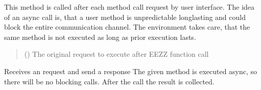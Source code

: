 \documentclass[letterpaper,10pt,english]{sphinxmanual}
\begin{document}
\begin{savenotes}
\begin{fulllineitems}
\begin{savenotes}\begin{fulllineitems}
\label{\detokenize{eezz:eezz.websocket.TWebSocketClient.handle_aync_request}}
\pysigstartsignatures
{}
\pysigstopsignatures
\sphinxAtStartPar
This method is called after each method call request by user interface. The idea of an async call is,
that a user method is unpredictable long\sphinxhyphen{}lasting and could block the entire communication channel.
The environment takes care, that the same method is not executed as long as prior execution lasts.
\begin{quote}\begin{description}
\sphinxAtStartPar
{} () \textendash{} The original request to execute after EEZZ function call

\end{description}\end{quote}

\end{fulllineitems}\end{savenotes}


\begin{savenotes}\begin{fulllineitems}
\label{\detokenize{eezz:eezz.websocket.TWebSocketClient.handle_request}}
\pysigstartsignatures
{}
\pysigstopsignatures
\sphinxAtStartPar
Receives an request and send a response
The given method is executed async, so there will be no blocking calls. After the call the result
is collected.

\end{fulllineitems}\end{savenotes}



\end{fulllineitems}
\end{savenotes}
\end{document}
